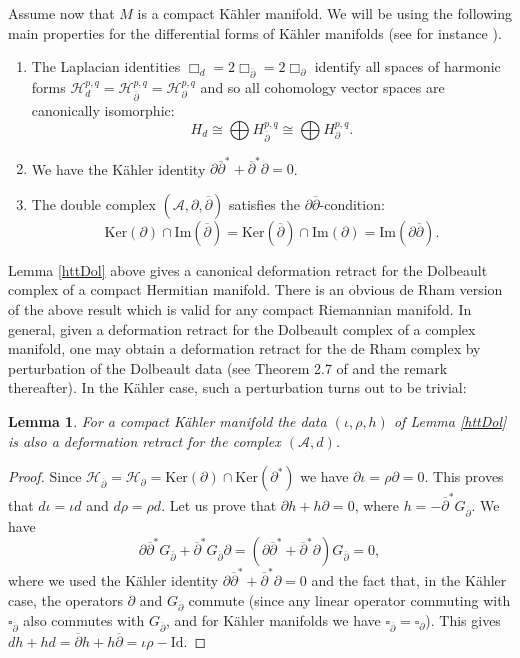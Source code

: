 \documentclass[a4paper]{amsart}
\newtheorem{lemm}[theo]{Lemma}
\theoremstyle{definition}
\theoremstyle{theorem}
\newcommand{\Aa}{\mathcal{A}}
\newcommand{\Hh}{\mathcal{H}}
\newcommand{\Ker}{\mathrm{Ker}}
\newcommand{\Img}{\mathrm{Im}}
\newcommand{\del}{\partial}
\newcommand{\delb}{{\overline\partial}}
\newcommand{\Id}{\mathrm{Id}}
\begin{document}
Assume now that $M$ is a compact Kähler manifold. 
We will be using the following main properties for the 
differential forms of Kähler manifolds (see for instance \cite{GH}).

\begin{enumerate}
 \item The Laplacian identities $\Box_d=2\Box_\delb=2\Box_\del$ identify all spaces of harmonic forms $\Hh_d^{p,q}=\Hh_\delb^{p,q}=\Hh_\del^{p,q}$ and so all cohomology vector spaces are canonically isomorphic: \[H_d\cong \bigoplus H_\delb^{p,q}\cong \bigoplus H_\del^{p,q}.\]
  \item We have the Kähler identity $\del\delb^*+\delb^*\del=0$.
 \item The double complex $(\Aa,\del,\delb)$ satisfies the $\del\delb$-condition:
 \[\Ker(\del)\cap \Img(\delb)=\Ker(\delb)\cap\Img(\del)=\Img(\del\delb).\]
\end{enumerate}

Lemma \ref{httDol} above gives a canonical deformation retract for the Dolbeault complex of a compact Hermitian manifold. There is an obvious de Rham version of the above result which is valid for any compact Riemannian manifold.
In general, given a deformation retract for the Dolbeault complex of a complex manifold,
one may obtain a deformation retract for the de Rham complex by perturbation of the Dolbeault data (see Theorem 2.7 of \cite{CiSo} and the remark thereafter).
In the Kähler case, such a perturbation turns out to be trivial:

\begin{lemm}\label{httdR}
 For a compact Kähler manifold the data $(\iota,\rho,h)$ of Lemma \ref{httDol} is also a deformation retract for the complex $(\Aa,d)$.
\end{lemm}

\begin{proof}Since $\Hh_\delb=\Hh_\del=\Ker(\del)\cap \Ker(\del^*)$ 
we have $\del\iota=\rho\del=0$. 
This proves that $d\iota=\iota d$ and $d\rho=\rho d$.
Let us prove that $\del h + h\del=0$, where $h=-\delb^* G_\delb$. We have
\[\del\delb^* G_\delb+\delb^* G_\delb\del = 
(\del\delb^* +\delb^* \del) G_\delb=0,
\]
where we used the Kähler identity $\del\delb^*+\delb^*\del=0$ and the fact that, in the Kähler case, the operators $\del$ and $G_\delb$ commute (since any linear operator commuting with $\square_\delb$ also commutes with $G_\delb$, and for Kähler manifolds we have $\square_\delb=\square_\del$).
This gives $dh+hd=\delb h+h\delb=\iota\rho-\Id$.
\end{proof}
\end{document}
